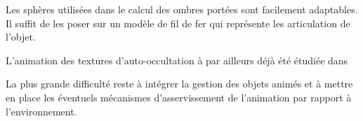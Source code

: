 \documentclass[10pt,a4paper,twoside, twocolumn]{report}
\newcommand*{\rootPath}{../}
\begin{document}
Les sphères utilisées dans le calcul des ombres portées sont facilement adaptables. Il suffit de les poser sur un modèle de fil de fer qui représente les articulation de l’objet.

L’animation des textures d’auto-occultation à par ailleurs déjà été étudiée dans \cite{Kontkanen2006}

La plus grande difficulté reste à intégrer la gestion des objets animés et à mettre en place les éventuels mécanismes d’asservissement de l’animation par rapport à l’environnement.

\ifstandalone
	
	
\fi
\end{document}
